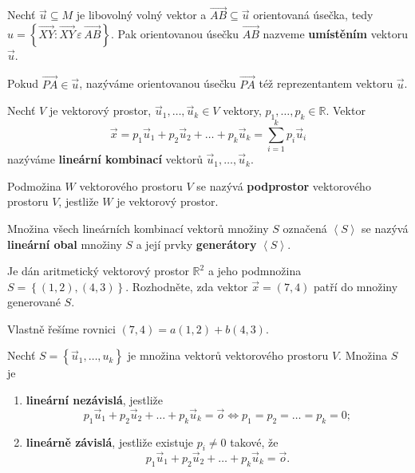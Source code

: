 \begin{definition}
Nechť $\vec u \subseteq M$ je libovolný volný vektor a $\overrightarrow{AB}\subseteq \vec u$ orientovaná úsečka, tedy
$u =\left  \{ \overrightarrow{XY} : \overrightarrow{XY} \, \varepsilon \, \overrightarrow{AB} \right \}$. Pak orientovanou úsečku $\overrightarrow{AB}$ nazveme \textbf{umístěním} vektoru $\vec u$.
\end{definition}

\begin{definition}
    Pokud $\overrightarrow{PA}\in \vec u$, nazýváme orientovanou úsečku $\overrightarrow{PA}$ též reprezentantem vektoru $\vec u$.
\end{definition}

\begin{definition}
    Nechť $V$ je vektorový prostor, $\vec u_1,\dots, \vec u_k\in V$ vektory, $p_1,\dots,
    p_k\in \mathbb R.$ Vektor
    $$\vec x = p_1\vec u_1 + p_2\vec u_2 + \dots + p_k\vec u_k = \sum_{i=1}^{k} p_i\vec u_i$$
    nazýváme \textbf{lineární kombinací} vektorů $\vec u_1,\dots, \vec u_k.$
\end{definition}

\begin{definition}
    Podmožina $W$ vektorového prostoru $V$ se nazývá \textbf{podprostor} vektorového
    prostoru $V$, jestliže $W$ je vektorový prostor.
\end{definition}

\begin{definition}
    Množina všech lineárních kombinací vektorů množiny $S$ označená $\left < S \right >$ se nazývá \textbf{lineární
    obal} množiny $S$ a její prvky \textbf{generátory} $\left < S \right >$.
\end{definition}

\begin{priklad}
Je dán aritmetický vektorový prostor $\mathbb R^{2}$ a jeho podmnožina $S=\left \{ (1,2), (4,3) \right \}. $
Rozhodněte, zda vektor $\vec x = (7,4)$ patří do množiny generované $S$.
\end{priklad}

\begin{reseni}
Vlastně řešíme rovnici $(7,4)=a(1,2)+b(4,3).$
\end{reseni}

\begin{definition}
    Nechť $S= \left \{ \vec u_1, \dots, u_k \right \} $ je množina vektorů vektorového prostoru $V$. Množina $S$ je
   	\begin{enumerate}[$i.$]
    \item \textbf{lineární nezávislá}, jestliže
    $$p_1\vec u_1 + p_2\vec u_2 + \dots + p_k\vec u_k = \vec o \iff p_1 = p_2 = \dots = p_k = 0;$$
   	\item \textbf{lineárně závislá}, jestliže existuje $p_i\ne 0$ takové, že
    $$ p_1\vec u_1 + p_2\vec u_2 + \dots + p_k\vec u_k = \vec o.$$
    \end{enumerate}
\end{definition}

